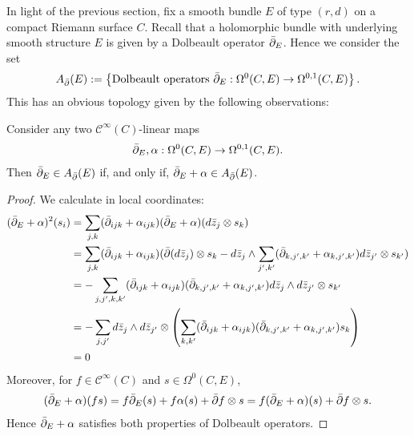 \documentclass[12pt]{ociamthesis}  %
\begin{document}
In light of the previous section, fix a smooth bundle $E$ of type $(r,d)$
on a compact Riemann surface $C$.
Recall that a holomorphic bundle with underlying smooth structure $E$
is given by a Dolbeault operator ${\bar{\partial}}_E$. Hence we consider the set
\begin{align*}
  A_{\bar{\partial}} (E) := \left\lbrace{
    \text{Dolbeault operators ${\bar{\partial}}_E : \Omega^0(C,E) \to \Omega^{0,1}(C,E)$}
  }\right\rbrace.
\end{align*}
This has an obvious topology given by the following observations:
\begin{lemma}\label{lem:affine_space_of_dolbeault_operators}
  Consider any two $\mathscr C^\infty(C)$-linear maps
  \begin{align*}
    {\bar{\partial}}_E,\alpha : \Omega^0(C,E) \to \Omega^{0,1}(C,E).
  \end{align*}
  Then ${\bar{\partial}}_E\in A_{\bar{\partial}} (E)$ if, and only if, ${\bar{\partial}}_E+\alpha\in A_{\bar{\partial}} (E)$.
  \begin{proof}
    We calculate in local coordinates:
    \begin{align*}
      ({\bar{\partial}}_E + \alpha)^2(s_i)
       & = \sum_{j,k} ({\bar{\partial}}_{ijk} + \alpha_{ijk})({\bar{\partial}}_E + \alpha)( d\bar z_j\otimes s_k)                                                                                     \\
       & = \sum_{j,k} ({\bar{\partial}}_{ijk} + \alpha_{ijk})({\bar{\partial}}(d\bar z_j) \otimes s_k -  d\bar z_j \wedge \sum_{j',k'}({\bar{\partial}}_{k,j',k'} + \alpha_{k,j',k'}) d\bar z_{j'}\otimes s_{k'}) \\
       & = - \sum_{j,j',k,k'} ({\bar{\partial}}_{ijk} + \alpha_{ijk})({\bar{\partial}}_{k,j',k'} + \alpha_{k,j',k'}) d\bar z_j \wedge d\bar z_{j'}\otimes s_{k'}                                      \\
       & = - \sum_{j,j'}
      d\bar z_j \wedge d\bar z_{j'}\otimes \left(
      \sum_{k,k'} ({\bar{\partial}}_{ijk} + \alpha_{ijk})({\bar{\partial}}_{k,j',k'} + \alpha_{k,j',k'}) s_{k}\right)                                                                                 \\
       & = 0
    \end{align*}
    Moreover, for $f\in \mathscr C^\infty(C)$ and $s\in\Omega^0(C,E)$,
    \begin{align*}
      ({\bar{\partial}}_E + \alpha)(fs) = f{\bar{\partial}}_E(s) + f\alpha(s) + {\bar{\partial}} f \otimes s
      = f({\bar{\partial}}_E+\alpha)(s) + {\bar{\partial}} f \otimes s.
    \end{align*}
    Hence ${\bar{\partial}}_E + \alpha$ satisfies both properties of Dolbeault
    operators.
  \end{proof}
\end{lemma}
\end{document}
